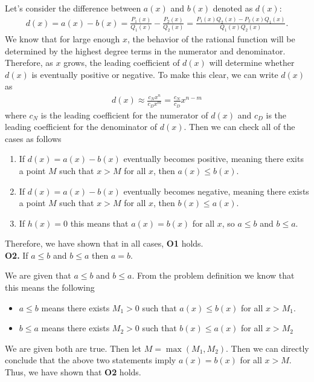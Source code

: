 \documentclass [10pt]{article}
\begin{document}
\begin{enumerate}
\begin{enumerate}
{Let's consider the difference between $a(x)$ and $b(x)$ denoted as $d(x)$: 
\begin{align*}
    d(x) = a(x) - b(x) = \frac{P_1(x)}{Q_1(x)} - \frac{P_2(x)}{Q_2(x)} = \frac{P_1(x) Q_2(x) - P_2(x) Q_1(x)}{Q_1(x) Q_2(x)}.
\end{align*}
We know that for large enough $x$, the behavior of the rational function will be determined by the highest degree terms in the numerator and denominator. Therefore, as $x$ grows, the leading coefficient of $d(x)$ will determine whether $d(x)$ is eventually positive or negative. To make this clear, we can write $d(x)$ as 
\begin{align*}
    d(x) \approx \frac{c_N x^n}{c_D x^m} = \frac{c_N}{c_D} x^{n-m}
\end{align*}
where $c_N$ is the leading coefficient for the numerator of $d(x)$ and $c_D$ is the leading coefficient for the denominator of $d(x)$. Then we can check all of the cases as follows
\begin{enumerate}
    \item If $d(x) = a(x) - b(x)$ eventually becomes positive, meaning there exits a point $M$ such that $x>M$ for all $x$, then $a(x) \leq b(x)$. 
    \item If $d(x) = a(x) - b(x)$ eventually becomes negative, meaning there exists a point $M$ such that $x>M$ for all $x$, then $b(x) \leq a(x)$. 
    \item If $h(x)=0$ this means that $a(x) = b(x)$ for all $x$, so $a \leq b$ and $b \leq a$. 
\end{enumerate}
Therefore, we have shown that in all cases, \textbf{O1} holds. \\

\textbf{O2.} If $a\leq b$ and $b\leq a$ then $a=b$. 

We are given that $a \leq b$ and $b \leq a$. From the problem definition we know that this means the following 
\begin{itemize}
    \item $a \leq b$ means there exists $M_1 >0$ such that $a(x) \leq b(x)$ for all $x > M_1$.
    \item $b \leq a$ means there exists $M_2 > 0$ such that $b(x) \leq a(x)$ for all $x > M_2$
\end{itemize}
We are given both are true. Then let $M = \max(M_1, M_2)$. Then we can directly conclude that the above two statements imply $a(x) = b(x)$ for all $x > M$. Thus, we have shown that \textbf{O2} holds. \\

}
\end{enumerate}
\end{enumerate}
\end{document}
